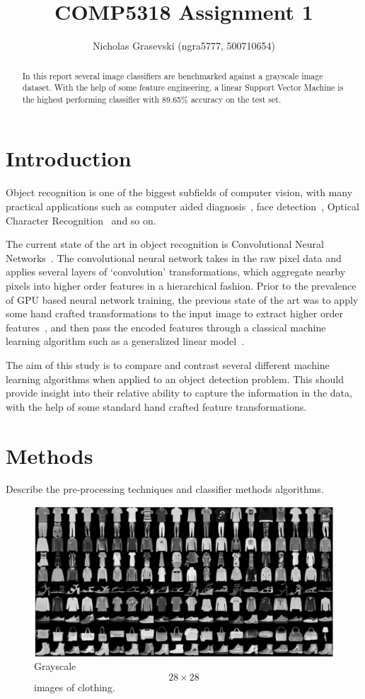 \documentclass[landscape,twocolumn]{article}
\title{COMP5318 Assignment 1}
\author{Nicholas Grasevski (ngra5777, 500710654)}
\begin{document}
\maketitle
\begin{abstract}
In this report several image classifiers are benchmarked against a grayscale image dataset. With the help of some feature engineering, a linear Support Vector Machine is the highest performing classifier with 89.65\% accuracy on the test set.
\end{abstract}

\section{Introduction}
Object recognition is one of the biggest subfields of computer vision, with many practical applications such as computer aided diagnosis~\cite{doi2007computer}, face detection~\cite{hjelmaas2001face}, Optical Character Recognition~\cite{mori1999optical} and so on.

The current state of the art in object recognition is Convolutional Neural Networks~\cite{iandola2016squeezenet}. The convolutional neural network takes in the raw pixel data and applies several layers of `convolution' transformations, which aggregate nearby pixels into higher order features in a hierarchical fashion. Prior to the prevalence of GPU based neural network training, the previous state of the art was to apply some hand crafted transformations to the input image to extract higher order features~\cite{rybski2010visual}, and then pass the encoded features through a classical machine learning algorithm such as a generalized linear model~\cite{ebrahimzadeh2014efficient}.

The aim of this study is to compare and contrast several different machine learning algorithms when applied to an object detection problem. This should provide insight into their relative ability to capture the information in the data, with the help of some standard hand crafted feature transformations.

\section{Methods}
Describe the pre-processing techniques and classifier methods algorithms.

\begin{figure}[ht]
\includegraphics[width=\linewidth]{../Dataset_image}
\caption{Grayscale \[28 \times 28\] images of clothing.}\label{fig:images}
\end{figure}
\end{document}
